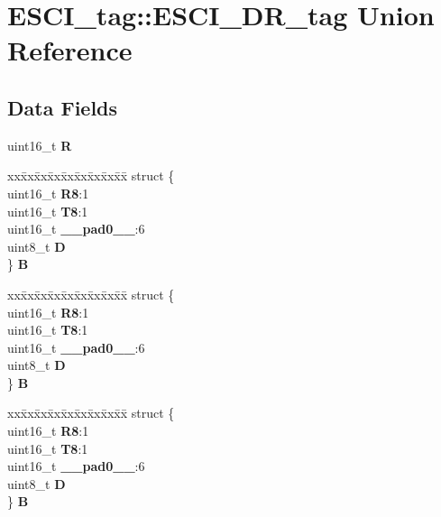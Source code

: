 \hypertarget{unionESCI__tag_1_1ESCI__DR__tag}{}\section{E\+S\+C\+I\+\_\+tag\+::E\+S\+C\+I\+\_\+\+D\+R\+\_\+tag Union Reference}
\label{unionESCI__tag_1_1ESCI__DR__tag}
\subsection*{Data Fields}
\begin{DoxyCompactItemize}
\item 
\mbox{\label{unionESCI__tag_1_1ESCI__DR__tag_a953eee8000ee2be399554c666b0f9af3}} 
uint16\+\_\+t {\bfseries R}
\item 
\mbox{\label{unionESCI__tag_1_1ESCI__DR__tag_a07fe4ac579428e26147493bbdab1431d}} 
\begin{tabbing}
xx\=xx\=xx\=xx\=xx\=xx\=xx\=xx\=xx\=\kill
struct \{\\
\>uint16\_t {\bfseries R8}:1\\
\>uint16\_t {\bfseries T8}:1\\
\>uint16\_t {\bfseries \_\_pad0\_\_}:6\\
\>uint8\_t {\bfseries D}\\
\} {\bfseries B}\\

\end{tabbing}\item 
\mbox{\label{unionESCI__tag_1_1ESCI__DR__tag_a0682d8aedeb73cc8e93444ab9580d054}} 
\begin{tabbing}
xx\=xx\=xx\=xx\=xx\=xx\=xx\=xx\=xx\=\kill
struct \{\\
\>uint16\_t {\bfseries R8}:1\\
\>uint16\_t {\bfseries T8}:1\\
\>uint16\_t {\bfseries \_\_pad0\_\_}:6\\
\>uint8\_t {\bfseries D}\\
\} {\bfseries B}\\

\end{tabbing}\item 
\mbox{\label{unionESCI__tag_1_1ESCI__DR__tag_ab7f060a55bf76858216314bb964ec2e7}} 
\begin{tabbing}
xx\=xx\=xx\=xx\=xx\=xx\=xx\=xx\=xx\=\kill
struct \{\\
\>uint16\_t {\bfseries R8}:1\\
\>uint16\_t {\bfseries T8}:1\\
\>uint16\_t {\bfseries \_\_pad0\_\_}:6\\
\>uint8\_t {\bfseries D}\\
\} {\bfseries B}\\


\end{tabbing}
\end{DoxyCompactItemize}

